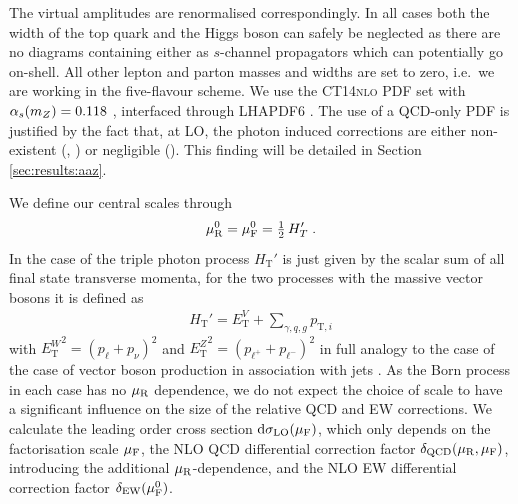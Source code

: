 The virtual amplitudes are renormalised correspondingly.
In all cases both the width of the top quark and the Higgs boson 
can safely be neglected as there are no diagrams containing either 
as $s$-channel propagators which can potentially go on-shell. 
All other lepton and parton masses and widths are set to zero, 
i.e.\ we are working in the five-flavour scheme.
We use the \textsc{CT14nlo} PDF set with $\alpha_s(m_Z)=0.118$ 
\cite{Dulat:2015mca}, interfaced through LHAPDF6 \cite{Buckley:2014ana}. 
The use of a QCD-only PDF is justified by the fact that, 
at LO, the photon induced corrections are either non-existent 
(\aaa, \aaw) or negligible (\aaz).
This finding will be detailed in Section \ref{sec:results:aaz}.

We define our central scales through
\begin{equation}
  \label{eq:murfdef}
    \muR^0 = \muF^0 = %
      \tfrac{1}{2}\,H_T' \;. %
\end{equation}
In the case of the triple photon process $ H_\mathrm{T}' $ is just given by the scalar sum of all final state 
transverse momenta, for the two processes with the massive vector bosons it is defined as 
\begin{equation}
  \label{ew:defHT}
  \begin{split}
    H_\mathrm{T}' = E_\mathrm{T}^V + \sum_{\gamma,q,g} p_{\mathrm{T},i}
  \end{split}
\end{equation}
with $\left.E_\mathrm{T}^W\right.^2=(p_\ell+p_\nu)^2$ and 
$\left.E_\mathrm{T}^Z\right.^2=(p_{\ell^+}+p_{\ell^-})^2$ 
in full analogy to the case of the case of vector boson production 
in association with jets \cite{Berger:2009ep}.
As the Born process in each case has no $\mu_{\mathrm{R}}$ dependence, we 
do not expect the choice of scale to have a significant influence 
on the size of the relative QCD and EW corrections.
We calculate the leading order cross section $\mathrm{d}\sigma_\text{LO}(\mu_{\mathrm{F}})$, 
which only depends on the factorisation scale $\mu_{\mathrm{F}}$, the 
NLO QCD differential correction factor $\delta_\text{QCD}(\mu_{\mathrm{R}},\mu_{\mathrm{F}})$, 
introducing the additional $\mu_{\mathrm{R}}$-dependence, and the NLO EW 
differential correction factor $\delta_\text{EW}(\mu_{\mathrm{F}}^0)$. 
